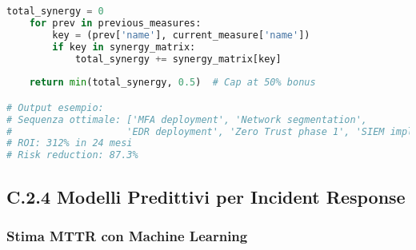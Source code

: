 \begin{lstlisting}[language=Python, caption=Ottimizzazione Sequenza Implementazione Security]
    total_synergy = 0
    for prev in previous_measures:
        key = (prev['name'], current_measure['name'])
        if key in synergy_matrix:
            total_synergy += synergy_matrix[key]
    
    return min(total_synergy, 0.5)  # Cap at 50% bonus

# Output esempio:
# Sequenza ottimale: ['MFA deployment', 'Network segmentation', 
#                    'EDR deployment', 'Zero Trust phase 1', 'SIEM implementation']
# ROI: 312% in 24 mesi
# Risk reduction: 87.3%
\end{lstlisting}

\subsection{C.2.4 Modelli Predittivi per Incident Response}

\subsubsection{Stima MTTR con Machine Learning}

